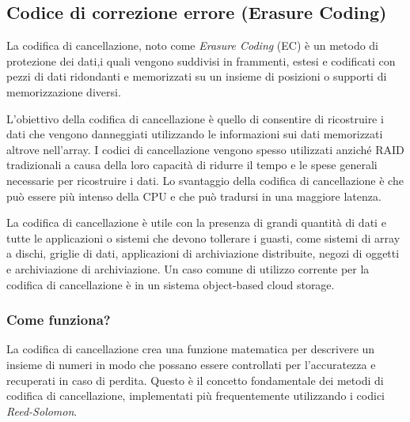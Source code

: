 \item
\subsection{Codice di correzione errore (Erasure Coding)}
La codifica di cancellazione, noto come \emph{Erasure Coding} (EC) \`{e} un metodo di protezione dei dati,i quali vengono suddivisi in frammenti, estesi e codificati con pezzi di dati ridondanti e memorizzati su un insieme di posizioni o supporti di memorizzazione diversi.\cite{etichetta11}

L'obiettivo della codifica di cancellazione \`{e} quello di consentire di ricostruire i dati che vengono danneggiati utilizzando le informazioni sui dati memorizzati altrove nell'array. I codici di cancellazione vengono spesso utilizzati anzich\'{e} RAID tradizionali a causa della loro capacit\`{a} di ridurre il tempo e le spese generali necessarie per ricostruire i dati. Lo svantaggio della codifica di cancellazione \`{e} che pu\`{o} essere pi\`{u} intenso della CPU e che pu\`{o} tradursi in una maggiore latenza.\cite{etichetta11}

La codifica di cancellazione \`{e} utile con la presenza di grandi quantit\`{a} di dati e tutte le applicazioni o sistemi che devono tollerare i guasti, come sistemi di array a dischi, griglie di dati, applicazioni di archiviazione distribuite, negozi di oggetti e archiviazione di archiviazione. Un caso comune di utilizzo corrente per la codifica di cancellazione \`{e} in un sistema object-based cloud storage\cite{etichetta11}.

\subsubsection{Come funziona?}
La codifica di cancellazione crea una funzione matematica per descrivere un insieme di numeri in modo che possano essere controllati per l'accuratezza e recuperati in caso di perdita. Questo \`{e} il concetto fondamentale dei metodi di codifica di cancellazione, implementati pi\`{u} frequentemente utilizzando i codici \textit{Reed-Solomon}\cite{etichetta11}. 

